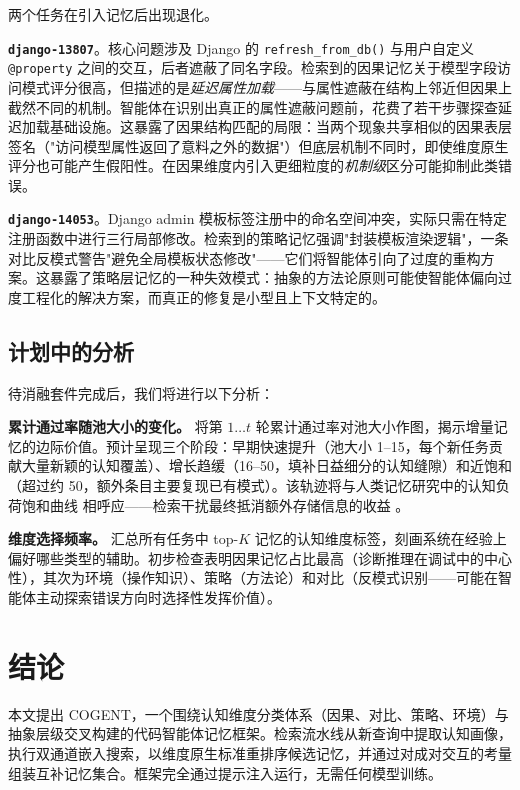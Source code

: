 \documentclass[UTF8,twocolumn]{ctexart}
\begin{document}
两个任务在引入记忆后出现退化。

\textbf{\texttt{django-13807}}。核心问题涉及 Django 的 \texttt{refresh\_from\_db()} 与用户自定义 \texttt{@property} 之间的交互，后者遮蔽了同名字段。检索到的因果记忆关于模型字段访问模式评分很高，但描述的是\emph{延迟属性加载}——与属性遮蔽在结构上邻近但因果上截然不同的机制。智能体在识别出真正的属性遮蔽问题前，花费了若干步骤探查延迟加载基础设施。这暴露了因果结构匹配的局限：当两个现象共享相似的因果表层签名（"访问模型属性返回了意料之外的数据"）但底层机制不同时，即使维度原生评分也可能产生假阳性。在因果维度内引入更细粒度的\emph{机制级}区分可能抑制此类错误。

\textbf{\texttt{django-14053}}。Django admin 模板标签注册中的命名空间冲突，实际只需在特定注册函数中进行三行局部修改。检索到的策略记忆强调"封装模板渲染逻辑"，一条对比反模式警告"避免全局模板状态修改"——它们将智能体引向了过度的重构方案。这暴露了策略层记忆的一种失效模式：抽象的方法论原则可能使智能体偏向过度工程化的解决方案，而真正的修复是小型且上下文特定的。

\subsection{计划中的分析}

待消融套件完成后，我们将进行以下分析：

\textbf{累计通过率随池大小的变化。} 将第 $1 \ldots t$ 轮累计通过率对池大小作图，揭示增量记忆的边际价值。预计呈现三个阶段：早期快速提升（池大小 1--15，每个新任务贡献大量新颖的认知覆盖）、增长趋缓（16--50，填补日益细分的认知缝隙）和近饱和（超过约 50，额外条目主要复现已有模式）。该轨迹将与人类记忆研究中的认知负荷饱和曲线 \cite{cognitive-load} 相呼应——检索干扰最终抵消额外存储信息的收益 \cite{ctim-rover}。

\textbf{维度选择频率。} 汇总所有任务中 top-$K$ 记忆的认知维度标签，刻画系统在经验上偏好哪些类型的辅助。初步检查表明因果记忆占比最高（诊断推理在调试中的中心性），其次为环境（操作知识）、策略（方法论）和对比（反模式识别——可能在智能体主动探索错误方向时选择性发挥价值）。

\section{结论}

本文提出 \textsc{COGENT}，一个围绕认知维度分类体系（因果、对比、策略、环境）与抽象层级交叉构建的代码智能体记忆框架。检索流水线从新查询中提取认知画像，执行双通道嵌入搜索，以维度原生标准重排序候选记忆，并通过对成对交互的考量组装互补记忆集合。框架完全通过提示注入运行，无需任何模型训练。
\end{document}
